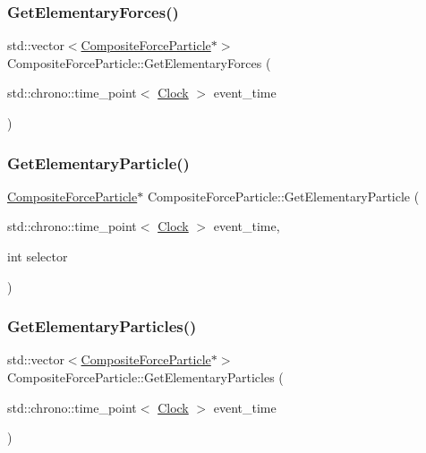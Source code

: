 \subsubsection{\texorpdfstring{Get\+Elementary\+Forces()}{GetElementaryForces()}}
{\footnotesize\ttfamily std\+::vector$<$\mbox{\hyperlink{classCompositeForceParticle}{Composite\+Force\+Particle}}$\ast$$>$ Composite\+Force\+Particle\+::\+Get\+Elementary\+Forces (\begin{DoxyParamCaption}\item[{std\+::chrono\+::time\+\_\+point$<$ \mbox{\hyperlink{universe_8h_a0ef8d951d1ca5ab3cfaf7ab4c7a6fd80}{Clock}} $>$}]{event\+\_\+time }\end{DoxyParamCaption})}

\mbox{\label{classCompositeForceParticle_a750da9f3cd367287b051b820857c80d0}} 
\subsubsection{\texorpdfstring{Get\+Elementary\+Particle()}{GetElementaryParticle()}}
{\footnotesize\ttfamily \mbox{\hyperlink{classCompositeForceParticle}{Composite\+Force\+Particle}}$\ast$ Composite\+Force\+Particle\+::\+Get\+Elementary\+Particle (\begin{DoxyParamCaption}\item[{std\+::chrono\+::time\+\_\+point$<$ \mbox{\hyperlink{universe_8h_a0ef8d951d1ca5ab3cfaf7ab4c7a6fd80}{Clock}} $>$}]{event\+\_\+time,  }\item[{int}]{selector }\end{DoxyParamCaption})}

\mbox{\label{classCompositeForceParticle_ab953693d61515b96fe78b0cf1da058c6}} 
\subsubsection{\texorpdfstring{Get\+Elementary\+Particles()}{GetElementaryParticles()}}
{\footnotesize\ttfamily std\+::vector$<$\mbox{\hyperlink{classCompositeForceParticle}{Composite\+Force\+Particle}}$\ast$$>$ Composite\+Force\+Particle\+::\+Get\+Elementary\+Particles (\begin{DoxyParamCaption}\item[{std\+::chrono\+::time\+\_\+point$<$ \mbox{\hyperlink{universe_8h_a0ef8d951d1ca5ab3cfaf7ab4c7a6fd80}{Clock}} $>$}]{event\+\_\+time }\end{DoxyParamCaption})}

